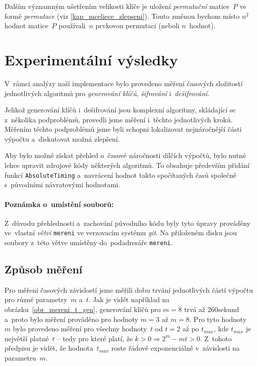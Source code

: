 \documentclass[thesis=M,czech,hidelinks]{FITthesis}[2012/06/26]
\newcommand{\0}{{\textcolor[gray]{0.75}{0}}}
\begin{document}
Dalším významným ušetřením velikosti klíče je uložení \emph{permutační}
matice~$P$ ve formě \emph{permutace} (viz \ref{kap_mceliece_zlepseni}). Touto
změnou bychom místo $n^2$ hodnot matice~$P$ používali~$n$ prvkovou permutaci
(neboli $n$~hodnot).


\section{Experimentální výsledky}\label{kap_mereni_experiment}

V~rámci analýzy naší implementace bylo provedeno měření časových složitostí
jednotlivých algoritmů pro \emph{generování klíčů}, \emph{šifrování}
i~\emph{dešifrování}.

Jelikož generování klíčů i~dešifrování jsou komplexní algoritmy, skládající se
z~několika podproblémů, provedli jsme měření i~těchto jednotlivých kroků.
Měřením těchto podproblémů jsme byli schopni lokalizovat nejnáročnější části
výpočtu a~diskutovat možná zlepšení.

Aby bylo možné získat přehled o~časové náročnosti dílčích výpočtů, bylo nutné
lehce upravit zdrojové kódy některých algoritmů. To obsahuje především přidání
funkcí \texttt{AbsoluteTiming} a~navrácení hodnot takto spočítaných časů
společně s~původními návratovými hodnotami.

\paragraph{Poznámka o~umístění souborů:} Z~důvodu přehlednosti a~zachování
původního kódu byly tyto úpravy prováděny ve~vlastní \emph{větvi}
\texttt{mereni} ve verzovacím systému \emph{git}. Na přiloženém disku jsou
soubory z~této větve umístěny do~podadresáře \texttt{mereni}.


\subsection{Způsob měření}

Pro měření časových závislostí jsme měřili dobu trvání jednotlivých částí
výpočtu pro různé parametry~$m$ a~$t$. Jak je vidět například na
obrázku~\ref{obr_mereni_t_gen}, generování klíčů pro $m=8$ trvá až 260\;sekund
a~proto bylo měření prováděno pro hodnoty $m = 3$ až $m=8$. Pro tyto hodnoty~$m$
bylo provedeno měření pro všechny hodnoty~$t$ od $t=2$ až po $t_{max}$, kde
$t_{max}$ je největší platné~$t$ -- tedy pro které platí, že
$k > 0 \Rightarrow 2^m - mt > 0$. Z~tohoto předpisu je vidět, že
hodnota~$t_{max}$ roste řádově exponenciálně v~závislosti na parametru~$m$.
\end{document}
